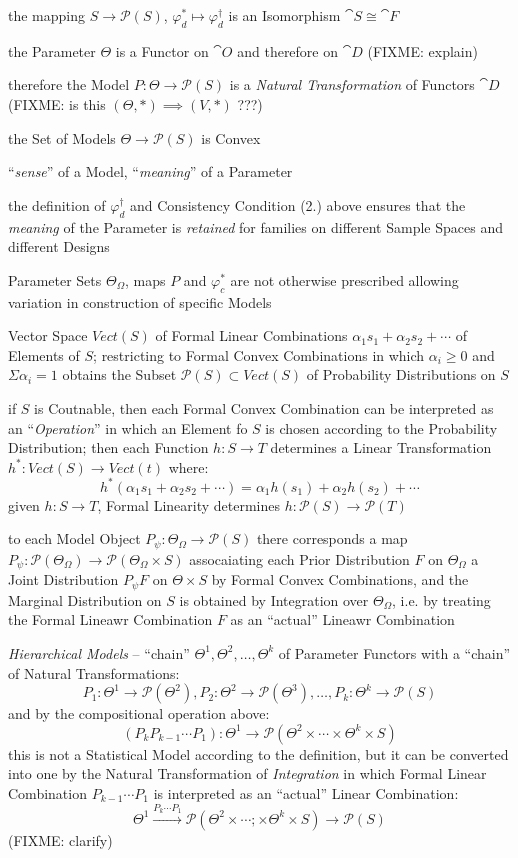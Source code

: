 the mapping $S \to \mathcal{P}(S)$, $\varphi_d^* \mapsto \varphi_d^\dagger$ is
an Isomorphism $\cat{S} \cong \cat{F}$

the Parameter $\Theta$ is a Functor on $\cat{O}$ and therefore on $\cat{D}$
(FIXME: explain)

therefore the Model $P : \Theta \to \mathcal{P}(S)$ is a \emph{Natural
  Transformation} of Functors $\cat{D}$ (FIXME: is this
$(\Theta, *) \implies (V, *)$ ???)

the Set of Models $\Theta \to \mathcal{P}(S)$ is Convex

``\emph{sense}'' of a Model, ``\emph{meaning}'' of a Parameter

the definition of $\varphi_d^\dagger$ and Consistency Condition (2.) above
ensures that the \emph{meaning} of the Parameter is \emph{retained} for families
on different Sample Spaces and different Designs

Parameter Sets $\Theta_\Omega$, maps $P$ and $\varphi_c^*$ are not otherwise
prescribed allowing variation in construction of specific Models

Vector Space $Vect(S)$ of Formal Linear Combinations
$\alpha_1 s_1 + \alpha_2 s_2 + \cdots$ of Elements of $S$; restricting to Formal
Convex Combinations in which $\alpha_i \geq 0$ and $\Sigma \alpha_i = 1$ obtains
the Subset $\mathcal{P}(S) \subset Vect(S)$ of Probability Distributions on $S$

if $S$ is Coutnable, then each Formal Convex Combination can be interpreted as
an ``\emph{Operation}'' in which an Element fo $S$ is chosen according to the
Probability Distribution; then each Function $h : S \to T$ determines a Linear
Transformation $h^* : Vect(S) \to Vect(t)$ where:
\[
  h^*(\alpha_1 s_1 + \alpha_2 s_2 + \cdots) =
    \alpha_1 h(s_1) + \alpha_2 h(s_2) + \cdots
\]
given $h : S \to T$, Formal Linearity determines
$h : \mathcal{P}(S) \to \mathcal{P}(T)$

to each Model Object $P_\psi : \Theta_\Omega \to \mathcal{P}(S)$ there
corresponds a map
$P_\psi : \mathcal{P}(\Theta_\Omega) \to \mathcal{P}(\Theta_\Omega \times S)$
assocaiating each Prior Distribution $F$ on $\Theta_\Omega$ a Joint Distribution
$P_\psi F$ on $\Theta \times S$ by Formal Convex Combinations, and the Marginal
Distribution on $S$ is obtained by Integration over $\Theta_\Omega$, i.e. by
treating the Formal Lineawr Combination $F$ as an ``actual'' Lineawr Combination

\emph{Hierarchical Models} -- ``chain'' $\Theta^1, \Theta^2, \ldots, \Theta^k$
of Parameter Functors with a ``chain'' of Natural Transformations:
\[
  P_1:\Theta^1 \to \mathcal{P}(\Theta^2),
  P_2:\Theta^2 \to \mathcal{P}(\Theta^3), \ldots,
  P_k:\Theta^k \to \mathcal{P}(S)
\]
and by the compositional operation above:
\[
  (P_k P_{k-1} \cdots P_1):
    \Theta^1 \to \mathcal{P}(\Theta^2 \times \cdots \times \Theta^k \times S)
\]
this is not a Statistical Model according to the definition, but it can be
converted into one by the Natural Transformation of \emph{Integration} in which
Formal Linear Combination $P_{k-1} \cdots P_1$ is interpreted as an ``actual''
Linear Combination:
\[
  \Theta^1 \xrightarrow{P_k \cdots P_1}
    \mathcal{P}(\Theta^2 \times \cdots ;\times \Theta^k \times S) \to
    \mathcal{P}(S)
\]
(FIXME: clarify)

